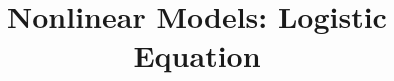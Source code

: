 \documentclass{beamer}
\title[Section 2.5]{Nonlinear Models: Logistic Equation}
\begin{document}
\begin{frame}
\titlepage
\end{frame}
\end{document}
